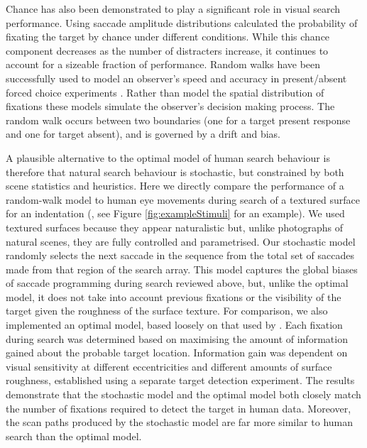 \documentclass[preprint, authoryear]{elsarticle} %
\begin{document}
\par
Chance has also been demonstrated to play a significant role in visual search performance. Using saccade amplitude distributions \cite{motter-holsapple2001} calculated the probability of fixating the target by chance under different conditions. While this chance component decreases as the number of distracters increase, it continues to account for a sizeable fraction of performance. Random walks have been successfully used to model an observer's speed and accuracy in present/absent forced choice experiments \citep{stone1960, reeves2005}. Rather than model the spatial distribution of fixations these models simulate the observer's decision making process. The random walk occurs between two boundaries (one for a target present response and one for target absent), and is governed by a drift and bias. 
\par
A plausible alternative to the optimal model of human search behaviour is therefore that natural search behaviour is stochastic, but constrained by both scene statistics and heuristics.  Here we directly compare the performance of a random-walk model to human eye movements during search of a textured surface  for an indentation (\cite{clarke2008}, see Figure \ref{fig:exampleStimuli} for an example). We used textured surfaces because they appear naturalistic but, unlike photographs of natural scenes, they are fully controlled and parametrised. Our stochastic model randomly selects the next saccade in the sequence from the total set of saccades made from that region of the search array. This model captures the global biases of saccade programming during search reviewed above, but, unlike the optimal model, it does not take into account previous fixations or the visibility of the target given the roughness of the surface texture. For comparison, we also implemented an optimal model, based loosely on that used by  \cite{najemnik-geisler2005}. Each fixation during search was determined based on maximising the amount of information gained about the probable target location. Information gain was dependent on visual sensitivity at different eccentricities and different amounts of surface roughness, established using a separate target detection experiment. The results demonstrate that the stochastic model and the optimal model both closely match the number of fixations required to detect the target in human data. Moreover, the scan paths produced by the stochastic model are far more similar to human search than the optimal model.

\end{document}
